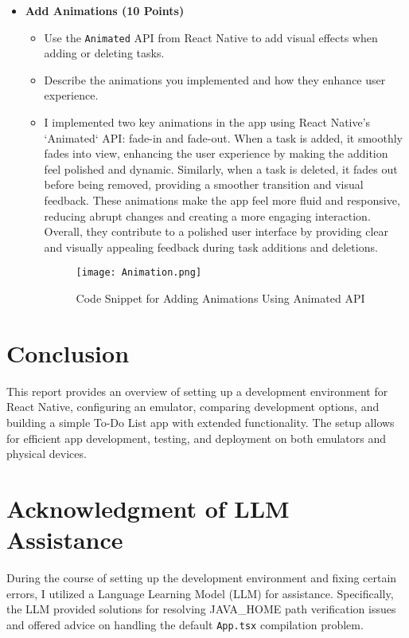 \documentclass{article}
\begin{document}
\begin{itemize}
    \item \textbf{Add Animations (10 Points)}
    \begin{itemize}
        \item Use the \texttt{Animated} API from React Native to add visual effects when adding or deleting tasks.
        \item Describe the animations you implemented and how they enhance user experience.
             \item I implemented two key animations in the app using React Native's `Animated` API: fade-in and fade-out. When a task is added, it smoothly fades into view, enhancing the user experience by making the addition feel polished and dynamic. Similarly, when a task is deleted, it fades out before being removed, providing a smoother transition and visual feedback. These animations make the app feel more fluid and responsive, reducing abrupt changes and creating a more engaging interaction. Overall, they contribute to a polished user interface by providing clear and visually appealing feedback during task additions and deletions.
        \begin{figure}[H]
            \centering
            \texttt{[image: Animation.png]}
            \caption{Code Snippet for Adding Animations Using Animated API}
        \end{figure}
    \end{itemize}
\end{itemize}

\section{Conclusion}
This report provides an overview of setting up a development environment for React Native, configuring an emulator, comparing development options, and building a simple To-Do List app with extended functionality. The setup allows for efficient app development, testing, and deployment on both emulators and physical devices.

\section{Acknowledgment of LLM Assistance}
During the course of setting up the development environment and fixing certain errors, I utilized a Language Learning Model (LLM) for assistance. Specifically, the LLM provided solutions for resolving JAVA\_HOME path verification issues and offered advice on handling the default \texttt{App.tsx} compilation problem.
\end{document}
